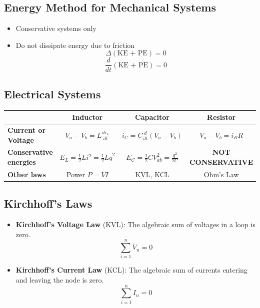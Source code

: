 \documentclass[a4paper]{article}
\begin{document}
\subsection{Energy Method for Mechanical Systems}
\begin{itemize}
    \item Conservative systems only
    \item Do not dissipate energy due to friction
    $$\Delta(\text{KE + PE}) = 0$$
    $$\frac{d}{dt}(\text{KE + PE}) = 0$$
\end{itemize}

\subsection{Electrical Systems}
\begin{table}[H]
\centering\makegapedcells
\begin{tabular}{|l|c|c|c|}
\hline
                               & \textbf{Inductor}                               & \textbf{Capacitor}                            & \textbf{Resistor}                                \\ \hline
\textbf{Current or Voltage}    & $V_a - V_b = L\displaystyle\frac{di_L}{dt}$                  & $i_C = C\displaystyle\frac{d}{dt}(V_a-V_b)$                & $V_a-V_b=i_RR$                                   \\ \hline
\textbf{Conservative energies} & $E_L = \displaystyle\frac{1}{2}Li^2 = \frac{1}{2}L\dot{q}^2$ & $E_C = \frac{1}{2}CV_{ab}^2 = \displaystyle\frac{q^2}{2C}$ & {\color[HTML]{FE0000} \textbf{NOT CONSERVATIVE}} \\ \hline
\textbf{Other laws}            & Power $P = VI$                                  & KVL, KCL                                      & Ohm's Law                                        \\ \hline
\end{tabular}
\end{table}

\newpage
\subsection{Kirchhoff's Laws}
\begin{itemize}
    \item \textbf{Kirchhoff's Voltage Law} (KVL): The algebraic sum of voltages in a loop is zero.
    $$\sum_{i=1}^n V_n = 0$$
    \item \textbf{Kirchhoff's Current Law} (KCL): The algebraic sum of currents entering and leaving the node is zero.
    $$\sum_{i=1}^n I_n = 0$$
\end{itemize}
\end{document}
